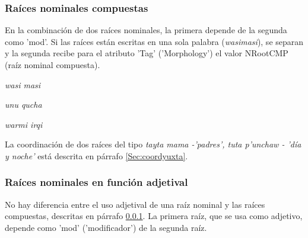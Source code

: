 \documentclass[a4paper,11pt,DIV12]{scrartcl}
\begin{document}
 \subsubsection{Ra\'ices nominales compuestas}\label{Sec:NRootCMP}
En la combinaci\'on de dos ra\'ices nominales, la primera depende de la segunda como 'mod'. Si las ra\'ices est\'an escritas en una sola palabra ({\em wasimasi}), se separan y la segunda recibe para el atributo 'Tag' ('Morphology') el valor NRootCMP (ra\'iz nominal compuesta).\\
\begin{center}
 \begin{minipage}{0.4\textwidth}
 \begin{examples}
 \item {\em wasi masi} 
 \item {\em unu qucha}
 \item {\em warmi irqi}
\end{examples}
\end{minipage}
\hfill
\begin{minipage}{0.5\textwidth}
\begin{center}
\end{center}
\end{minipage}
\end{center}


La coordinaci\'on de dos ra\'ices del tipo {\em tayta mama -'padres', tuta p'unchaw - 'd\'ia y noche'} est\'a descrita en p\'arrafo \ref{Sec:coordyuxta}.

\subsubsection{Ra\'ices nominales en funci\'on adjetival}

No hay diferencia entre el uso adjetival de una ra\'iz nominal y las ra\'ices compuestas, descritas en p\'arrafo \ref{Sec:NRootCMP}. La primera ra\'iz, que se usa como adjetivo, depende como 'mod' ('modificador') de la segunda ra\'iz.
\end{document}
